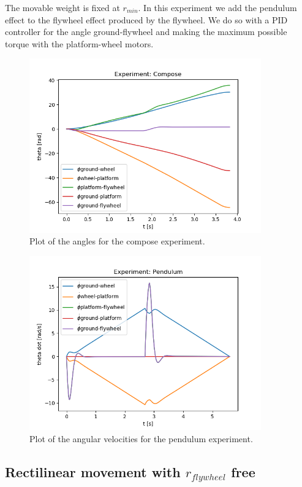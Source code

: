 \begin{enumerate}
	The movable weight is fixed at $r_{min}$. In this experiment we add the pendulum effect to the flywheel effect produced
		  by the flywheel. We do so with a PID controller for the angle ground-flywheel and making the maximum possible torque
		  with the platform-wheel motors. 
	      \begin{figure}[H]
		      \centering
		      \includegraphics[width=10cm]{img/lagrange_5/compose_q.png}
		      \caption{Plot of the angles for the compose experiment.}
		      \label{fig:Simulation compose q}
	      \end{figure}


	      \begin{figure}[H]
		      \centering
		      \includegraphics[width=10cm]{img/lagrange_5/pendulum_q_dot.png}
		      \caption{Plot of the angular velocities for the pendulum experiment.}
		      \label{fig:Simulation compose q dot}
	      \end{figure}
\end{enumerate}



\subsection{Rectilinear movement with $r_{flywheel}$ free}

